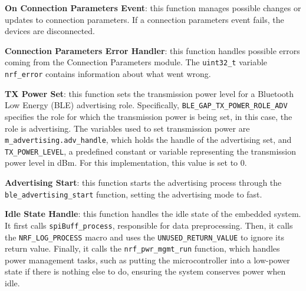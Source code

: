 \documentclass{Configuration_Files/PoliMi3i_thesis}
\begin{document}
\textbf{On Connection Parameters Event}: this function manages possible changes or updates to connection parameters. If a connection parameters event fails, the devices are disconnected.

\textbf{Connection Parameters Error Handler}: this function handles possible errors coming from the Connection Parameters module. The \texttt{uint32\_t} variable \texttt{nrf\_error} contains information about what went wrong.

\textbf{TX Power Set}: this function sets the transmission power level for a Bluetooth Low Energy (BLE) advertising role. Specifically, \texttt{BLE\_GAP\_TX\_POWER\_ROLE\_ADV} specifies the role for which the transmission power is being set, in this case, the role is advertising. The variables used to set transmission power are \texttt{m\_advertising.adv\_handle}, which holds the handle of the advertising set, and \texttt{TX\_POWER\_LEVEL}, a predefined constant or variable representing the transmission power level in dBm. For this implementation, this value is set to 0.


\textbf{Advertising Start}: this function starts the advertising process through the \texttt{ble\_advertising\_start} function, setting the advertising mode to fast.


\textbf{Idle State Handle}: this function handles the idle state of the embedded system. It first calls \texttt{spiBuff\_process}, responsible for data preprocessing. Then, it calls the \texttt{NRF\_LOG\_PROCESS} macro and uses the \texttt{UNUSED\_RETURN\_VALUE} to ignore its return value. Finally, it calls the \texttt{nrf\_pwr\_mgmt\_run} function, which handles power management tasks, such as putting the microcontroller into a low-power state if there is nothing else to do, ensuring the system conserves power when idle.
\end{document}
